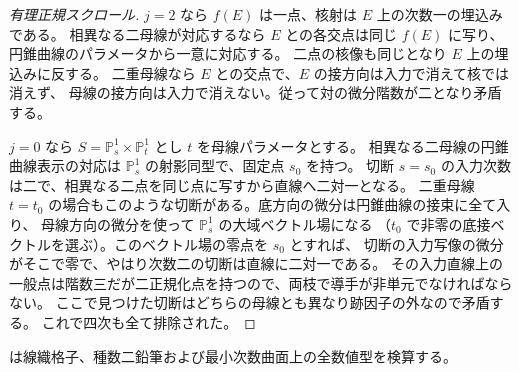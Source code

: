 \begin{proof}[有理正規スクロール]
$j=2$ なら $f(E)$ は一点、核射は $E$ 上の次数一の埋込みである。
相異なる二母線が対応するなら $E$ との各交点は同じ $f(E)$ に写り、円錐曲線のパラメータから一意に対応する。
二点の核像も同じとなり $E$ 上の埋込みに反する。
二重母線なら $E$ との交点で、$E$ の接方向は入力で消えて核では消えず、
母線の接方向は入力で消えない。従って対の微分階数が二となり矛盾する。

$j=0$ なら $S=\mathbb P^1_s\times\mathbb P^1_t$ とし $t$ を母線パラメータとする。
相異なる二母線の円錐曲線表示の対応は $\mathbb P^1_s$ の射影同型で、固定点 $s_0$ を持つ。
切断 $s=s_0$ の入力次数は二で、相異なる二点を同じ点に写すから直線へ二対一となる。
二重母線 $t=t_0$ の場合もこのような切断がある。底方向の微分は円錐曲線の接束に全て入り、
母線方向の微分を使って $\mathbb P^1_s$ の大域ベクトル場になる
（$t_0$ で非零の底接ベクトルを選ぶ）。このベクトル場の零点を $s_0$ とすれば、
切断の入力写像の微分がそこで零で、やはり次数二の切断は直線に二対一である。
その入力直線上の一般点は階数三だが二正規化点を持つので、両枝で導手が非単元でなければならない。
ここで見つけた切断はどちらの母線とも異なり跡因子の外なので矛盾する。
これで四次も全て排除された。
\end{proof}
 は線織格子、種数二鉛筆および最小次数曲面上の全数値型を検算する。
